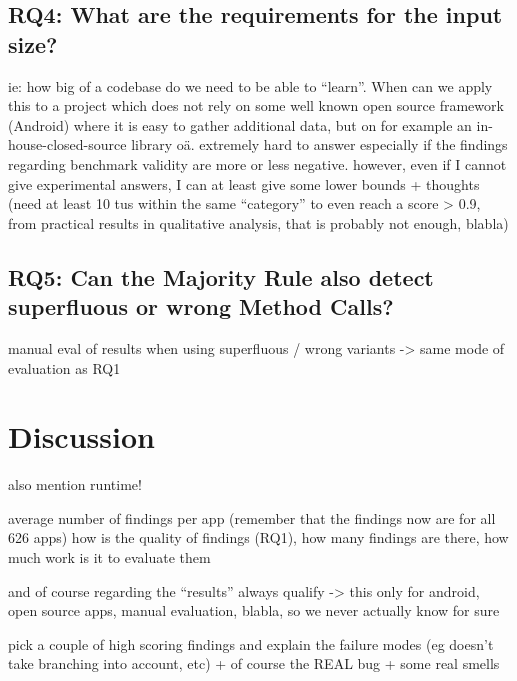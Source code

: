\subsection{RQ4: What are the requirements for the input size?}

ie: how big of a codebase do we need to be able to ``learn''. When can we apply this to a project which does not rely on some well known open source framework (Android) where it is easy to gather additional data, but on for example an in-house-closed-source library oä.
extremely hard to answer especially if the findings regarding benchmark validity are more or less negative.
however, even if I cannot give experimental answers, I can at least give some lower bounds + thoughts
(need at least 10 tus within the same ``category'' to even reach a score > 0.9, from practical results in qualitative analysis, that is probably not enough, blabla)



\subsection{RQ5: Can the Majority Rule also detect superfluous or wrong Method Calls?}

manual eval of results when using superfluous / wrong variants
-> same mode of evaluation as RQ1

\section{Discussion}

also mention runtime!

average number of findings per app (remember that the findings now are for all 626 apps)
how is the quality of findings (RQ1), how many findings are there, how much work is it to evaluate them

and of course regarding the ``results'' always qualify -> this only for android, open source apps, manual evaluation, blabla, so we never actually know for sure

pick a couple of high scoring findings and explain the failure modes (eg doesn't take branching into account, etc)
+ of course the REAL bug + some real smells

